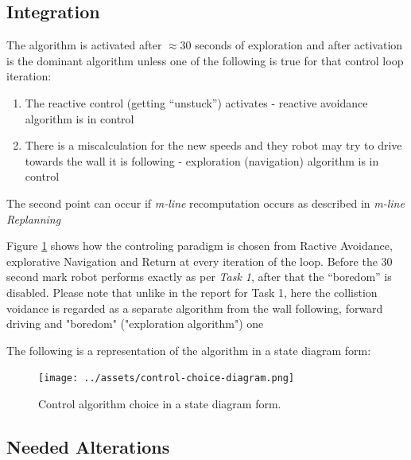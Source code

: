 \documentclass[11pt, a4paper]{article}
\begin{document}

\subsection{Integration}

The algorithm is activated after $\approx 30$ seconds of exploration\cite{task1_report} and after
activation is the dominant algorithm unless one of the following is true for that control loop iteration:

\begin{enumerate}	

	\item The reactive control (getting ``unstuck''\cite{task1_report}) activates - reactive avoidance algorithm is in control
	\item There is a miscalculation for the new speeds and they robot may try to drive towards the wall it is following - exploration (navigation) algorithm is in control

\end{enumerate}

The second point can occur if \textit{m-line} recomputation occurs as described in \textit{m-line Replanning}

Figure \ref{controlflow} shows how the controling paradigm is chosen from Ractive Avoidance, 
explorative Navigation and Return at every iteration of the loop. Before the 30 second mark robot
performs exactly as per \textit{Task 1}, after that the ``boredom''\cite{task1_report} is disabled. Please note
that unlike in the report for Task 1, here the collistion voidance is regarded as a separate algorithm from the
wall following, forward driving and "boredom" ("exploration algorithm") one

The following is a representation of the algorithm in a state diagram form:
\begin{figure}[H]
  \begin{center}
    \texttt{[image: ../assets/control-choice-diagram.png]}
    \caption{\label{controlflow}Control algorithm choice in a state diagram form.}
  \end{center}
\end{figure} 



\subsection{Needed Alterations}
\label{Needed Alterations}
\end{document}
